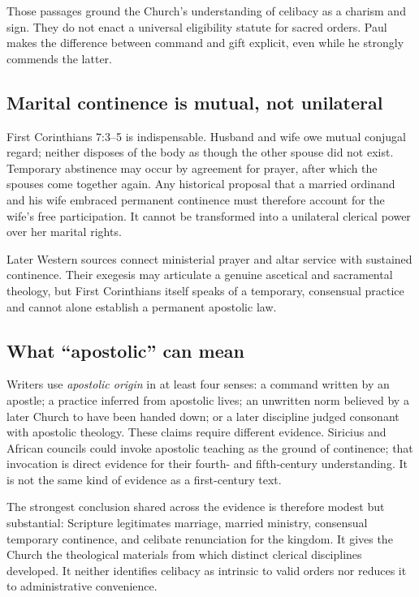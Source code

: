 Those passages ground the Church's understanding of celibacy as a charism and sign. They do not enact a universal eligibility statute for sacred orders. Paul makes the difference between command and gift explicit, even while he strongly commends the latter.

\subsection{Marital continence is mutual, not unilateral}

First Corinthians 7:3--5 is indispensable. Husband and wife owe mutual conjugal regard; neither disposes of the body as though the other spouse did not exist. Temporary abstinence may occur by agreement for prayer, after which the spouses come together again. Any historical proposal that a married ordinand and his wife embraced permanent continence must therefore account for the wife's free participation. It cannot be transformed into a unilateral clerical power over her marital rights.

Later Western sources connect ministerial prayer and altar service with sustained continence. Their exegesis may articulate a genuine ascetical and sacramental theology, but First Corinthians itself speaks of a temporary, consensual practice and cannot alone establish a permanent apostolic law.

\subsection{What ``apostolic'' can mean}

Writers use \emph{apostolic origin} in at least four senses: a command written by an apostle; a practice inferred from apostolic lives; an unwritten norm believed by a later Church to have been handed down; or a later discipline judged consonant with apostolic theology. These claims require different evidence. Siricius and African councils could invoke apostolic teaching as the ground of continence; that invocation is direct evidence for their fourth- and fifth-century understanding. It is not the same kind of evidence as a first-century text.

The strongest conclusion shared across the evidence is therefore modest but substantial: Scripture legitimates marriage, married ministry, consensual temporary continence, and celibate renunciation for the kingdom. It gives the Church the theological materials from which distinct clerical disciplines developed. It neither identifies celibacy as intrinsic to valid orders nor reduces it to administrative convenience.

